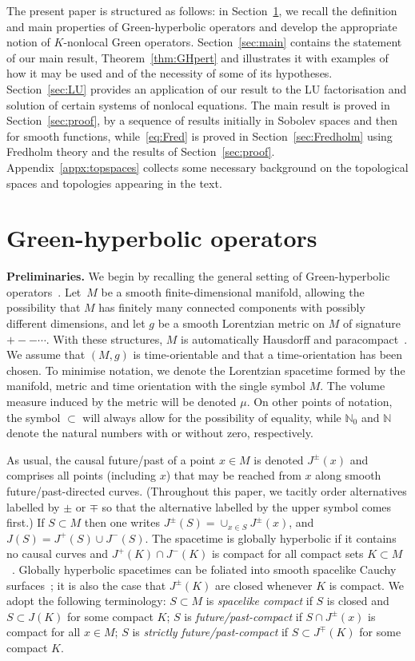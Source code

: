 \documentclass[pdftex]{sigma}
\numberwithin{equation}{section}
\newcommand{\NN}{{\mathbb N}}
\begin{document}
 The present paper is structured as follows: in Section~\ref{sec:GHOs}, we recall the definition and main properties of Green-hyperbolic operators and develop the appropriate notion of $K$-nonlocal Green operators. Section~\ref{sec:main} contains the statement of our main result, Theorem~\ref{thm:GHpert} and illustrates it with examples of how it may be used and of the necessity of some of its hypotheses. Section~\ref{sec:LU} provides an application of our result to the LU factorisation and solution of certain systems of nonlocal equations. The main result is proved in Section~\ref{sec:proof}, by a sequence of results initially in Sobolev spaces and then for smooth functions, while~\eqref{eq:Fred} is proved in Section~\ref{sec:Fredholm} using Fredholm theory and the results of Section~\ref{sec:proof}. Appendix~\ref{appx:topspaces} collects some necessary background on the topological spaces and topologies appearing in the text.


 \section{Green-hyperbolic operators}\label{sec:GHOs}

{\bf Preliminaries.}
 We begin by recalling the general setting of Green-hyperbolic operators~\cite{Baer:2015}. Let~$M$ be a smooth finite-dimensional manifold, allowing the possibility that $M$ has finitely many connected components with possibly different dimensions, and let $g$ be a smooth Lorentzian metric on $M$ of signature $+--\cdots$. With these structures, $M$ is automatically Hausdorff and paracompact~\cite{Geroch_spinorI:1968}.
 We assume that $(M,g)$ is time-orientable and that a time-orientation has been chosen. To minimise notation, we denote the Lorentzian spacetime formed by the manifold, metric and time orientation with the single symbol $M$. The volume measure induced by the metric will be denoted $\mu$. On other points of notation,
 the symbol $\subset$ will always allow for the possibility of equality, while $\NN_0$ and $\NN$ denote the natural numbers with or without zero, respectively.

 As usual, the causal future/past of a point $x\in M$ is denoted $J^\pm(x)$ and comprises all points (including $x$) that may be reached from $x$ along smooth future/past-directed curves. (Throughout this paper, we tacitly order alternatives labelled by $\pm$ or $\mp$ so that the alternative labelled by the upper symbol comes first.)
 If $S\subset M$ then one writes $J^\pm(S)=\cup_{x\in S} J^\pm(x)$, and $J(S)=J^+(S)\cup J^-(S)$. The spacetime is globally hyperbolic if it contains no causal curves and $J^+(K)\cap J^-(K)$ is compact for all compact sets $K\subset M$~\cite{Bernal:2006xf}. Globally hyperbolic spacetimes can be foliated into smooth spacelike Cauchy surfaces~\cite{Bernal:2004gm}; it is also the case that $J^\pm(K)$ are closed whenever $K$ is compact. We adopt the following terminology: $S\subset M$ is
 \emph{spacelike compact} if $S$ is closed and $S\subset J(K)$ for some compact $K$; $S$ is \emph{future/past-compact} if $S\cap J^{\pm}(x)$ is compact for all $x\in M$; $S$ is \emph{strictly future/past-compact} if
 $S\subset J^{\mp}(K)$ for some compact $K$.
\end{document}
